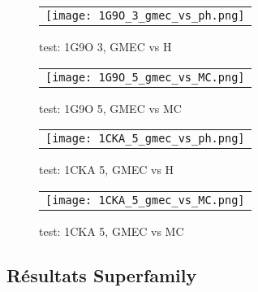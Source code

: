                 
    \begin{figure}[h]
      \centering
      \begin{tabular}{c} 
        \texttt{[image: 1G9O\_3\_gmec\_vs\_ph.png]} 
      \end{tabular}
      
      \caption{test: 1G9O 3, GMEC vs H}
\label{image:1G9O_3_GMEC_vs_H}
    \end{figure}
    
    
    \begin{figure}[h]
      \centering
      \begin{tabular}{c} 
        \texttt{[image: 1G9O\_5\_gmec\_vs\_MC.png]} 
      \end{tabular}
      
      \caption{test: 1G9O 5, GMEC vs MC}
\label{image:1G9O_5_GMEC_vs_MC}
    \end{figure}
    
    \begin{figure}[h]
      \centering
      \begin{tabular}{c} 
        \texttt{[image: 1CKA\_5\_gmec\_vs\_ph.png]} 
      \end{tabular}
      
      \caption{test: 1CKA 5, GMEC vs H}
\label{image:1CKA_5_GMEC_vs_H}
    \end{figure}

    \begin{figure}[h]
      \centering
      \begin{tabular}{c} 
        \texttt{[image: 1CKA\_5\_gmec\_vs\_MC.png]} 
      \end{tabular}
      
      \caption{test: 1CKA 5, GMEC vs MC}
\label{image:1CKA_5_GMEC_vs_MC}
    \end{figure}
    

   \subsection{Résultats Superfamily}


